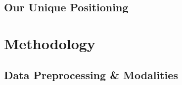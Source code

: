 \documentclass[11pt,a4paper]{article}
\begin{document}
\subsection{Our Unique Positioning}

\section{Methodology}
\label{sec:methodology}


\subsection{Data Preprocessing \& Modalities}
\label{subsec:data}

\end{document}
